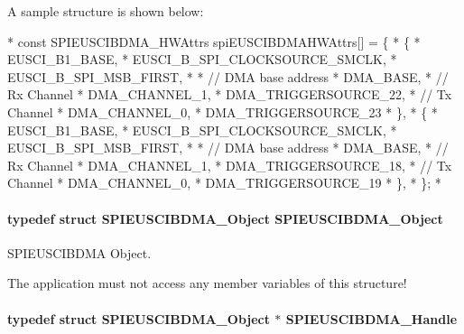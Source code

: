 A sample structure is shown below\-: 
\begin{DoxyCode}
*  \textcolor{keyword}{const} SPIEUSCIBDMA_HWAttrs spiEUSCIBDMAHWAttrs[] = \{
*      \{
*          EUSCI\_B1\_BASE,
*          EUSCI\_B\_SPI\_CLOCKSOURCE\_SMCLK,
*          EUSCI\_B\_SPI\_MSB\_FIRST,
*
*          \textcolor{comment}{// DMA base address}
*          DMA\_BASE,
*          \textcolor{comment}{// Rx Channel}
*          DMA\_CHANNEL\_1,
*          DMA\_TRIGGERSOURCE\_22,
*          \textcolor{comment}{// Tx Channel}
*          DMA\_CHANNEL\_0,
*          DMA\_TRIGGERSOURCE\_23
*      \},
*      \{
*          EUSCI\_B1\_BASE,
*          EUSCI\_B\_SPI\_CLOCKSOURCE\_SMCLK,
*          EUSCI\_B\_SPI\_MSB\_FIRST,
*
*          \textcolor{comment}{// DMA base address}
*          DMA\_BASE,
*          \textcolor{comment}{// Rx Channel}
*          DMA\_CHANNEL\_1,
*          DMA\_TRIGGERSOURCE\_18,
*          \textcolor{comment}{// Tx Channel}
*          DMA\_CHANNEL\_0,
*          DMA\_TRIGGERSOURCE\_19
*      \},
*  \};
*  
\end{DoxyCode}
\paragraph[{S\-P\-I\-E\-U\-S\-C\-I\-B\-D\-M\-A\-\_\-\-Object}]{\setlength{\rightskip}{0pt plus 5cm}typedef struct {\bf S\-P\-I\-E\-U\-S\-C\-I\-B\-D\-M\-A\-\_\-\-Object}  {\bf S\-P\-I\-E\-U\-S\-C\-I\-B\-D\-M\-A\-\_\-\-Object}}\label{_s_p_i_e_u_s_c_i_b_d_m_a_8h_a2ec8ab315cc978ab2308a24ba6b6f82f}


S\-P\-I\-E\-U\-S\-C\-I\-B\-D\-M\-A Object. 

The application must not access any member variables of this structure! 
\paragraph[{S\-P\-I\-E\-U\-S\-C\-I\-B\-D\-M\-A\-\_\-\-Handle}]{\setlength{\rightskip}{0pt plus 5cm}typedef struct {\bf S\-P\-I\-E\-U\-S\-C\-I\-B\-D\-M\-A\-\_\-\-Object} $\ast$ {\bf S\-P\-I\-E\-U\-S\-C\-I\-B\-D\-M\-A\-\_\-\-Handle}}\label{_s_p_i_e_u_s_c_i_b_d_m_a_8h_af48075210fdae29550dff1b9074cd29b}


